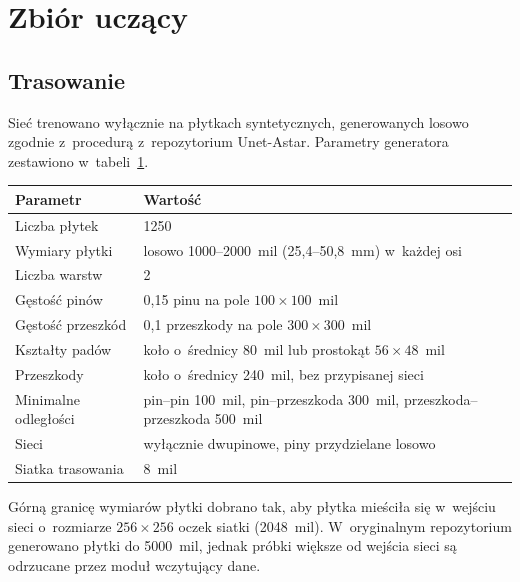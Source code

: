 \section{Zbiór uczący}
\label{sec:zbior-uczacy}

\subsection{Trasowanie}
\label{sec:zbior-uczacy-trasowanie}

Sieć trenowano wyłącznie na płytkach syntetycznych, generowanych losowo zgodnie
z~procedurą z~repozytorium Unet-Astar. Parametry generatora zestawiono
w~tabeli~\ref{tab:generator}.

\begin{table}[ht]
\label{tab:generator}
\centering\footnotesize%
\begin{tabular}{p{} p{}}
\toprule
Parametr & Wartość \\
\midrule
Liczba płytek & 1250 \\
\midrule
Wymiary płytki & losowo 1000--2000~mil (25{,}4--50{,}8~mm) w~każdej osi \\
\midrule
Liczba warstw & 2 \\
\midrule
Gęstość pinów & 0{,}15 pinu na pole $100 \times 100$~mil \\
\midrule
Gęstość przeszkód & 0{,}1 przeszkody na pole $300 \times 300$~mil \\
\midrule
Kształty padów & koło o~średnicy 80~mil lub prostokąt $56 \times 48$~mil \\
\midrule
Przeszkody & koło o~średnicy 240~mil, bez przypisanej sieci \\
\midrule
Minimalne odległości & pin--pin 100~mil, pin--przeszkoda 300~mil,
  przeszkoda--przeszkoda 500~mil \\
  \midrule
Sieci & wyłącznie dwupinowe, piny przydzielane losowo \\
\midrule
Siatka trasowania & 8~mil \\
\bottomrule
\end{tabular}
\end{table}

Górną granicę wymiarów płytki dobrano tak, aby płytka mieściła się w~wejściu
sieci o~rozmiarze $256 \times 256$ oczek siatki (2048~mil). W~oryginalnym
repozytorium generowano płytki do 5000~mil, jednak próbki większe od wejścia
sieci są odrzucane przez moduł wczytujący dane.

